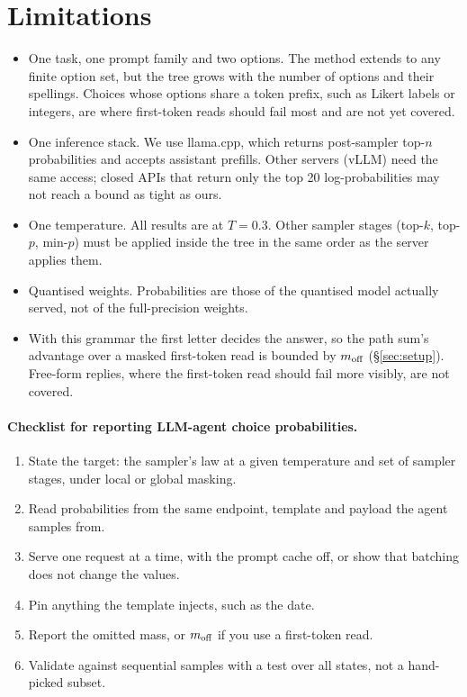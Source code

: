 \section*{Limitations}
\label{sec:limitations}

\begin{itemize}[leftmargin=*,itemsep=2pt]
  \item One task, one prompt family and two options. The method extends to any finite option set, but the tree grows with the number of options and their spellings. Choices whose options share a token prefix, such as Likert labels or integers, are where first-token reads should fail most and are not yet covered. 
  \item One inference stack. We use llama.cpp, which returns post-sampler top-$n$ probabilities and accepts assistant prefills. Other servers (vLLM) need the same access; closed APIs that return only the top 20 log-probabilities may not reach a bound as tight as ours.
  \item One temperature. All results are at $T=0.3$.  Other sampler stages (top-$k$, top-$p$, min-$p$) must be applied inside the tree in the same order as the server applies them.
  \item Quantised weights. Probabilities are those of the quantised model actually served, not of the full-precision weights.
  \item With this grammar the first letter decides the answer, so the path sum's advantage over a masked first-token read is bounded by $m_{\text{off}}$ (\S\ref{sec:setup}). Free-form replies, where the first-token read should fail more visibly, are not covered. 
\end{itemize}

\paragraph{Checklist for reporting LLM-agent choice probabilities.}
\begin{enumerate}[leftmargin=*,itemsep=2pt]
  \item State the target: the sampler's law at a given temperature and set of sampler stages, under local or global masking.
  \item Read probabilities from the same endpoint, template and payload the agent samples from.
  \item Serve one request at a time, with the prompt cache off, or show that batching does not change the values.
  \item Pin anything the template injects, such as the date.
  \item Report the omitted mass, or $m_{\text{off}}$ if you use a first-token read.
  \item Validate against sequential samples with a test over all states, not a hand-picked subset.
\end{enumerate}

